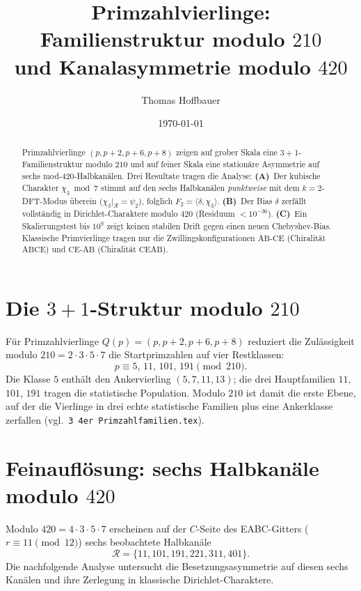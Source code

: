 \documentclass[11pt,a4paper]{article}
\title{Primzahlvierlinge: Familienstruktur modulo $210$\\und Kanalasymmetrie modulo $420$}
\author{Thomas Hoffbauer}
\date{\today}
\begin{document}
\maketitle

\begin{abstract}
Primzahlvierlinge $(p,p+2,p+6,p+8)$ zeigen auf grober Skala eine
$3{+}1$-Familienstruktur modulo $210$ und auf feiner Skala eine stationäre
Asymmetrie auf sechs mod-$420$-Halbkanälen.
Drei Resultate tragen die Analyse:
\textbf{(A)}~Der kubische Charakter $\chi_3 \bmod 7$ stimmt auf den sechs
Halbkanälen \emph{punktweise} mit dem $k{=}2$-DFT-Modus überein
($\chi_3|_{\mathcal{R}}=\psi_2$), folglich $F_2=\langle\delta,\chi_3\rangle$.
\textbf{(B)}~Der Bias $\delta$ zerfällt vollständig in Dirichlet-Charaktere
modulo $420$ (Residuum $<10^{-36}$).
\textbf{(C)}~Ein Skalierungstest bis $10^9$ zeigt keinen stabilen Drift
gegen einen neuen Chebyshev-Bias.
Klassische Primvierlinge tragen nur die Zwillingskonfigurationen
$\mathrm{AB\text{-}CE}$ (Chiralität $\mathrm{ABCE}$) und
$\mathrm{CE\text{-}AB}$ (Chiralität $\mathrm{CEAB}$).
\end{abstract}

\section{Die $3{+}1$-Struktur modulo $210$}

Für Primzahlvierlinge $Q(p)=(p,p+2,p+6,p+8)$ reduziert die Zulässigkeit
modulo $210=2\cdot 3\cdot 5\cdot 7$ die Startprimzahlen auf vier Restklassen:
\[
  p \equiv 5,\, 11,\, 101,\, 191 \pmod{210}.
\]
Die Klasse $5$ enthält den Ankervierling $(5,7,11,13)$; die drei Hauptfamilien
$11$, $101$, $191$ tragen die statistische Population.
Modulo $210$ ist damit die erste Ebene, auf der die Vierlinge in drei echte
statistische Familien plus eine Ankerklasse zerfallen
(vgl.\ \texttt{3\ 4er\ Primzahlfamilien.tex}).

\section{Feinauflösung: sechs Halbkanäle modulo $420$}

Modulo $420=4\cdot 3\cdot 5\cdot 7$ erscheinen auf der $C$-Seite des
EABC-Gitters ($r\equiv 11\pmod{12}$) sechs beobachtete Halbkanäle
\[
  \mathcal{R}=\{11,101,191,221,311,401\}.
\]
Die nachfolgende Analyse untersucht die Besetzungsasymmetrie auf diesen
sechs Kanälen und ihre Zerlegung in klassische Dirichlet-Charaktere.


\end{document}
